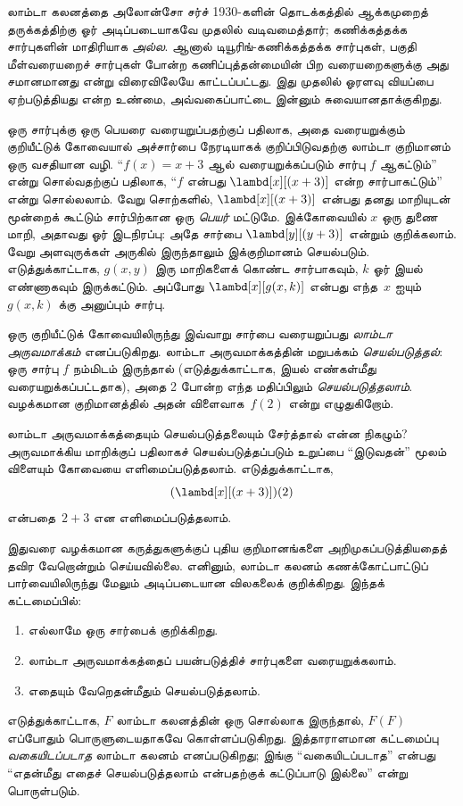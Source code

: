 \documentclass[../../../include/open-logic-section]{subfiles}
\begin{document}

லாம்டா கலனத்தை அலோன்சோ சர்ச் 1930-களின் தொடக்கத்தில் ஆக்கமுறைத் தருக்கத்திற்கு
ஓர் அடிப்படையாகவே முதலில் வடிவமைத்தார்; கணிக்கத்தக்க சார்புகளின் மாதிரியாக
\emph{அல்ல}. ஆனால் டியூரிங்-கணிக்கத்தக்க சார்புகள், பகுதி மீள்வரையறைச்
சார்புகள் போன்ற கணிப்புத்தன்மையின் பிற வரையறைகளுக்கு அது சமானமானது என்று
விரைவிலேயே காட்டப்பட்டது. இது முதலில் ஓரளவு வியப்பை ஏற்படுத்தியது என்ற
உண்மை, அவ்வகைப்பாட்டை இன்னும் சுவையானதாக்குகிறது.

ஒரு சார்புக்கு ஒரு பெயரை வரையறுப்பதற்குப் பதிலாக, அதை வரையறுக்கும் குறியீட்டுக்
கோவையால் அச்சார்பை நேரடியாகக் குறிப்பிடுவதற்கு லாம்டா குறிமானம் ஒரு வசதியான
வழி. ``$f(x) = x + 3$ ஆல் வரையறுக்கப்படும் சார்பு $f$ ஆகட்டும்'' என்று
சொல்வதற்குப் பதிலாக, ``$f$ என்பது $\lambd[x][(x + 3)]$ என்ற சார்பாகட்டும்''
என்று சொல்லலாம். வேறு சொற்களில், $\lambd[x][(x+3)]$ என்பது தனது மாறியுடன்
மூன்றைக் கூட்டும் சார்பிற்கான ஒரு \emph{பெயர்} மட்டுமே. இக்கோவையில் $x$ ஒரு
துணை மாறி, அதாவது ஓர் இடநிரப்பு: அதே சார்பை $\lambd[y][(y + 3)]$ என்றும்
குறிக்கலாம். வேறு அளவுருக்கள் அருகில் இருந்தாலும் இக்குறிமானம் செயல்படும்.
எடுத்துக்காட்டாக, $g(x, y)$ இரு மாறிகளைக் கொண்ட சார்பாகவும், $k$ ஓர் இயல்
எண்ணாகவும் இருக்கட்டும். அப்போது $\lambd[x][g(x,k)]$ என்பது எந்த~$x$ ஐயும்
~$g(x, k)$ க்கு அனுப்பும் சார்பு.

ஒரு குறியீட்டுக் கோவையிலிருந்து இவ்வாறு சார்பை வரையறுப்பது \emph{லாம்டா
அருவமாக்கம்} எனப்படுகிறது. லாம்டா அருவமாக்கத்தின் மறுபக்கம்
\emph{செயல்படுத்தல்}: ஒரு சார்பு $f$ நம்மிடம் இருந்தால் (எடுத்துக்காட்டாக,
இயல் எண்கள்மீது வரையறுக்கப்பட்டதாக), அதை 2 போன்ற எந்த மதிப்பிலும்
\emph{செயல்படுத்தலாம்}. வழக்கமான குறிமானத்தில் அதன் விளைவாக~$f(2)$ என்று
எழுதுகிறோம்.

லாம்டா அருவமாக்கத்தையும் செயல்படுத்தலையும் சேர்த்தால் என்ன நிகழும்? அருவமாக்கிய
மாறிக்குப் பதிலாகச் செயல்படுத்தப்படும் உறுப்பை ``இடுவதன்'' மூலம் விளையும்
கோவையை எளிமைப்படுத்தலாம். எடுத்துக்காட்டாக,
\[
(\lambd[x][(x + 3)])(2)
\]
என்பதை~$2 + 3$ என எளிமைப்படுத்தலாம்.

இதுவரை வழக்கமான கருத்துகளுக்குப் புதிய குறிமானங்களை அறிமுகப்படுத்தியதைத் தவிர
வேறொன்றும் செய்யவில்லை. எனினும், லாம்டா கலனம் கணக்கோட்பாட்டுப் பார்வையிலிருந்து
மேலும் அடிப்படையான விலகலைக் குறிக்கிறது. இந்தக் கட்டமைப்பில்:
\begin{enumerate}
\item எல்லாமே ஒரு சார்பைக் குறிக்கிறது.
\item லாம்டா அருவமாக்கத்தைப் பயன்படுத்திச் சார்புகளை வரையறுக்கலாம்.
\item எதையும் வேறெதன்மீதும் செயல்படுத்தலாம்.
\end{enumerate}
எடுத்துக்காட்டாக, $F$ லாம்டா கலனத்தின் ஒரு சொல்லாக இருந்தால், $F(F)$ எப்போதும்
பொருளுடையதாகவே கொள்ளப்படுகிறது. இத்தாராளமான கட்டமைப்பு \emph{வகையிடப்படாத}
லாம்டா கலனம் எனப்படுகிறது; இங்கு ``வகையிடப்படாத'' என்பது ``எதன்மீது எதைச்
செயல்படுத்தலாம் என்பதற்குக் கட்டுப்பாடு இல்லை'' என்று பொருள்படும்.
\end{document}
